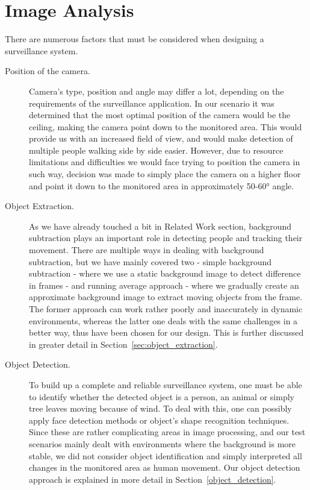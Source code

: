 \section{Image Analysis}
\label{sec:analysis_img}
There are numerous factors that must be considered when designing a surveillance system.
\begin{description}
\item[Position of the camera.] Camera's type, position and angle may differ a lot, depending on the requirements of the surveillance application. In our scenario it was determined that the most optimal position of the camera would be the ceiling, making the camera point down to the monitored area. This would provide us with an increased field of view, and would make detection of multiple people walking side by side easier. However, due to resource limitations and difficulties we would face trying to position the camera in such way, decision was made to simply place the camera on a higher floor and point it down to the monitored area in approximately 50-60\si{\degree} angle.

\item[Object Extraction.] As we have already touched a bit in Related Work section, background subtraction plays an important role in detecting people and tracking their movement. There are multiple ways in dealing with background subtraction, but we have mainly covered two - simple background subtraction - where we use a static background image to detect difference in frames - and running average approach - where we gradually create an approximate background image to extract moving objects from the frame. The former approach can work rather poorly and inaccurately in dynamic environments, whereas the latter one deals with the same challenges in a better way, thus have been chosen for our design. This is further discussed in greater detail in Section~\ref{sec:object_extraction}.

\item[Object Detection.] To build up a complete and reliable surveillance system, one must be able to identify whether the detected object is a person, an animal or simply tree leaves moving because of wind. To deal with this, one can possibly apply face detection methods or object's shape recognition techniques. Since these are rather complicating areas in image processing, and our test scenarios mainly dealt with environments where the background is more stable, we did not consider object identification and simply interpreted all changes in the monitored area as human movement. Our object detection approach is explained in more detail in Section~\ref{object_detection}.


\end{description}
